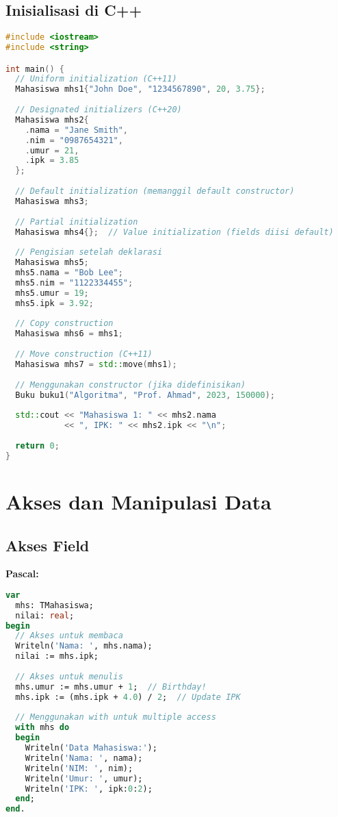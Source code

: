 \documentclass[../main.tex]{subfiles}
\begin{document}
\subsection{Inisialisasi di C++}

\begin{lstlisting}[language=C++, caption={Inisialisasi struct di C++}]
#include <iostream>
#include <string>

int main() {
  // Uniform initialization (C++11)
  Mahasiswa mhs1{"John Doe", "1234567890", 20, 3.75};
  
  // Designated initializers (C++20)
  Mahasiswa mhs2{
    .nama = "Jane Smith",
    .nim = "0987654321",
    .umur = 21,
    .ipk = 3.85
  };
  
  // Default initialization (memanggil default constructor)
  Mahasiswa mhs3;
  
  // Partial initialization
  Mahasiswa mhs4{};  // Value initialization (fields diisi default)
  
  // Pengisian setelah deklarasi
  Mahasiswa mhs5;
  mhs5.nama = "Bob Lee";
  mhs5.nim = "1122334455";
  mhs5.umur = 19;
  mhs5.ipk = 3.92;
  
  // Copy construction
  Mahasiswa mhs6 = mhs1;
  
  // Move construction (C++11)
  Mahasiswa mhs7 = std::move(mhs1);
  
  // Menggunakan constructor (jika didefinisikan)
  Buku buku1("Algoritma", "Prof. Ahmad", 2023, 150000);
  
  std::cout << "Mahasiswa 1: " << mhs2.nama 
            << ", IPK: " << mhs2.ipk << "\n";
  
  return 0;
}
\end{lstlisting}

\section{Akses dan Manipulasi Data}

\subsection{Akses Field}

\textbf{Pascal:}
\begin{lstlisting}[language=Pascal, caption={Akses field di Pascal}]
var
  mhs: TMahasiswa;
  nilai: real;
begin
  // Akses untuk membaca
  Writeln('Nama: ', mhs.nama);
  nilai := mhs.ipk;
  
  // Akses untuk menulis
  mhs.umur := mhs.umur + 1;  // Birthday!
  mhs.ipk := (mhs.ipk + 4.0) / 2;  // Update IPK
  
  // Menggunakan with untuk multiple access
  with mhs do
  begin
    Writeln('Data Mahasiswa:');
    Writeln('Nama: ', nama);
    Writeln('NIM: ', nim);
    Writeln('Umur: ', umur);
    Writeln('IPK: ', ipk:0:2);
  end;
end.
\end{lstlisting}
\end{document}
